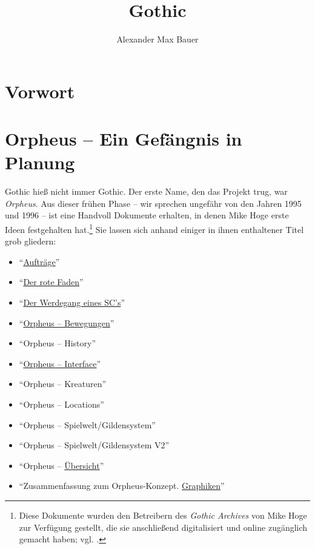 \documentclass[a5paper,pagesize]{scrbook}
\title{Gothic}
\subtitle{}
\author{Alexander Max Bauer}
\date{}
\begin{document}
\maketitle


\frontmatter
\tableofcontents


\chapter{Vorwort}


\mainmatter
\chapter{Orpheus -- Ein Gefängnis in Planung}\label{ch:orpheus}
Gothic hieß nicht immer Gothic.
Der erste Name, den das Projekt trug, war \textit{Orpheus}. %
Aus dieser frühen Phase -- wir sprechen ungefähr von den Jahren 1995 und 1996 -- ist eine Handvoll Dokumente erhalten, in denen Mike Hoge erste Ideen festgehalten hat.\footnote{Diese Dokumente wurden den Betreibern des \textit{Gothic Archives} von Mike Hoge zur Verfügung gestellt, die sie anschließend digitalisiert und online zugänglich gemacht haben; vgl. \autocite{archive_orpheus}.}
Sie lassen sich anhand einiger in ihnen enthaltener Titel grob gliedern:

\begin{itemize}
   \item \enquote{\uline{Aufträge}}\autocite[S.~16--17]{orpheus_b_scribbles}
   \item \enquote{\uline{Der rote Faden}}\autocite{orpheus_der_rote}
   \item \enquote{\uline{Der Werdegang eines SC's}}\autocite{orpheus_der_werdegang}
   \item \enquote{\uline{Orpheus -- Bewegungen}}\autocite{orpheus_bewegungen}
   \item \enquote{Orpheus -- History}\autocite[S.~2--3]{orpheus_b_scribbles}
   \item \enquote{\uline{Orpheus -- Interface}}\autocite{orpheus_interface}
   \item \enquote{Orpheus -- Kreaturen}\autocite[S.~4]{orpheus_b_scribbles}
   \item \enquote{Orpheus -- Locations}\autocite[S.~5]{orpheus_b_scribbles}
   \item \enquote{Orpheus -- Spielwelt/Gildensystem}\autocite{orpheus_gildensystem}
   \item \enquote{Orpheus -- Spielwelt/Gildensystem V2}\autocite{orpheus_gildensystem_v2}
   \item \enquote{Orpheus -- \uline{Übersicht}}\autocite[S.~11--14]{orpheus_b_scribbles}
   \item \enquote{Zusammenfassung zum Orpheus-Konzept. \uline{Graphiken}}\autocite{orpheus_zusammenfassung}
\end{itemize}
\end{document}
